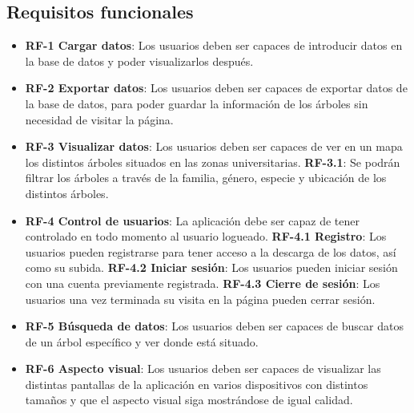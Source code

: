 \subsection{Requisitos funcionales}
\begin{itemize}
	\item \textbf{RF-1 Cargar datos}: Los usuarios deben ser capaces de introducir datos en la base de datos y poder visualizarlos después.
	\item \textbf{RF-2 Exportar datos}: Los usuarios deben ser capaces de exportar datos de la base de datos, para poder guardar la información de los árboles sin necesidad de visitar la página.
	\item \textbf{RF-3 Visualizar datos}: Los usuarios deben ser capaces de ver en un mapa los distintos árboles situados en las zonas universitarias.
	\subitem \textbf{RF-3.1}: Se podrán filtrar los árboles a través de la familia, género, especie y ubicación de los distintos árboles.
	\item \textbf{RF-4 Control de usuarios}: La aplicación debe ser capaz de tener controlado en todo momento al usuario logueado.
	\subitem \textbf{RF-4.1 Registro}: Los usuarios pueden registrarse para tener acceso a la descarga de los datos, así como su subida.
	\subitem \textbf{RF-4.2 Iniciar sesión}: Los usuarios pueden iniciar sesión con una cuenta previamente registrada.
	\subitem \textbf{RF-4.3 Cierre de sesión}: Los usuarios una vez terminada su visita en la página pueden cerrar sesión. 
	\item \textbf{RF-5 Búsqueda de datos}: Los usuarios deben ser capaces de buscar datos de un árbol específico y ver donde está situado.
	\item \textbf{RF-6 Aspecto visual}: Los usuarios deben ser capaces de visualizar las distintas pantallas de la aplicación en varios dispositivos con distintos tamaños y que el aspecto visual siga mostrándose de igual calidad. 

\end{itemize}
